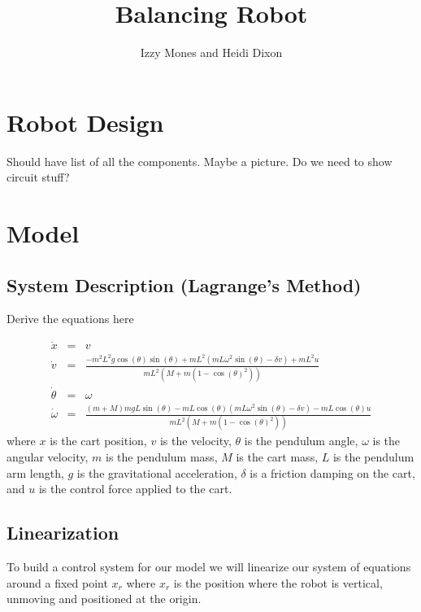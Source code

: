 \documentclass[]{article}
\title{Balancing Robot}
\author{Izzy Mones and Heidi Dixon}
\begin{document}
	\maketitle

\section*{Robot Design}
Should have list of all the components. Maybe a picture. Do we need to show circuit stuff?

\section*{Model}
\subsection*{System Description (Lagrange's Method)}
Derive the equations here

\begin{eqnarray}
	\dot{x} & = & v \\
	\dot{v}          & = & \frac{-m^2L^2g \cos(\theta)\sin(\theta) + mL^2(mL\omega^2 \sin(\theta)-\delta v)+mL^2u }{mL^2(M+m(1-\cos(\theta)^2))} \\
	\dot{\theta}  &= & \omega \\
	\dot{\omega}  &= & \frac{(m+M)mgL\sin(\theta)-mL\cos(\theta)(mL\omega^2\sin(\theta)-\delta v)-mL\cos(\theta)u}{mL^2(M+m(1-\cos(\theta)^2))}
\end{eqnarray}
where $x$ is the cart position, $v$ is the velocity, $\theta$ is the pendulum angle, $\omega$ is the angular velocity, $m$ is the pendulum mass, $M$ is the cart mass, $L$ is the pendulum arm length, $g$ is the gravitational acceleration, $\delta$ is a friction damping on the cart, and $u$ is the control force applied to the cart.


\subsection*{Linearization}
To build a control system for our model we will linearize our system of equations around a fixed point $x_r$ where $x_r$ is the position where the robot is vertical, unmoving and positioned at the origin.  
\end{document}
